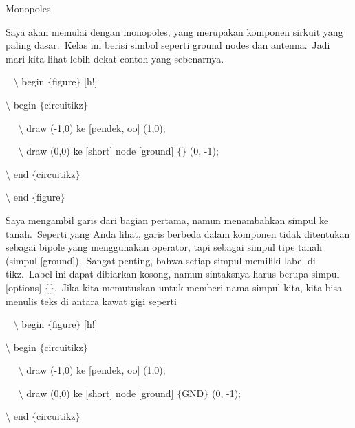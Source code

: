 \noindent 
Monopoles
\par


\noindent 
Saya akan memulai dengan monopoles, yang merupakan komponen sirkuit yang paling dasar. Kelas ini berisi simbol seperti ground nodes dan antenna. Jadi mari kita lihat lebih dekat contoh yang sebenarnya.
\par


\noindent 
~ $\setminus$ begin $ \{ $figure$ \} $ [h!]
\par


\noindent 
 $\setminus$ begin $ \{ $circuitikz$ \} $
\par


\noindent 
~~ $\setminus$ draw (-1,0) ke [pendek, oo] (1,0);
\par


\noindent 
~~ $\setminus$ draw (0,0) ke [short] node [ground] $ \{ $$ \} $ (0, -1);
\par


\noindent 
 $\setminus$ end $ \{ $circuitikz$ \} $
\par


\noindent 
 $\setminus$ end $ \{ $figure$ \} $ 
\par


\noindent 
Saya mengambil garis dari bagian pertama, namun menambahkan simpul ke tanah. Seperti yang Anda lihat, garis berbeda dalam komponen tidak ditentukan sebagai bipole yang menggunakan operator, tapi sebagai simpul tipe tanah (simpul [ground]). Sangat penting, bahwa setiap simpul memiliki label di tikz. Label ini dapat dibiarkan kosong, namun sintaksnya harus berupa simpul [options] $ \{ $$ \} $. Jika kita memutuskan untuk memberi nama simpul kita, kita bisa menulis teks di antara kawat gigi seperti
\par


\noindent 
~ $\setminus$ begin $ \{ $figure$ \} $ [h!]
\par


\noindent 
 $\setminus$ begin $ \{ $circuitikz$ \} $
\par


\noindent 
~~ $\setminus$ draw (-1,0) ke [pendek, oo] (1,0);
\par


\noindent 
~~ $\setminus$ draw (0,0) ke [short] node [ground] $ \{ $GND$ \} $ (0, -1);
\par


\noindent 
 $\setminus$ end $ \{ $circuitikz$ \} $
\par


